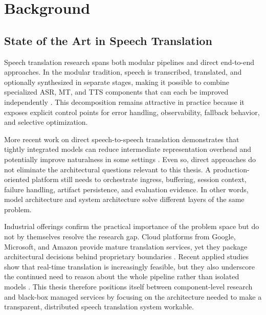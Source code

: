 \chapter{Background}
\label{chap:background}


\section{State of the Art in Speech Translation}
\label{sec:sota}

Speech translation research spans both modular pipelines and direct end-to-end approaches. In the modular tradition, speech is transcribed, translated, and optionally synthesized in separate stages, making it possible to combine specialized ASR, MT, and TTS components that can each be improved independently \cite{bahdanau2014neural,vaswani2017attention,radford2022whisper,wang2020fairseq}. This decomposition remains attractive in practice because it exposes explicit control points for error handling, observability, fallback behavior, and selective optimization.

More recent work on direct speech-to-speech translation demonstrates that tightly integrated models can reduce intermediate representation overhead and potentially improve naturalness in some settings \cite{inaguma2023unity,sarim2024direct,zhang2024direct}. Even so, direct approaches do not eliminate the architectural questions relevant to this thesis. A production-oriented platform still needs to orchestrate ingress, buffering, session context, failure handling, artifact persistence, and evaluation evidence. In other words, model architecture and system architecture solve different layers of the same problem.

Industrial offerings confirm the practical importance of the problem space but do not by themselves resolve the research gap. Cloud platforms from Google, Microsoft, and Amazon provide mature translation services, yet they package architectural decisions behind proprietary boundaries \cite{google_cloud_translate,microsoft_translator,aws_transcribe,aws_translate,aws_polly}. Recent applied studies show that real-time translation is increasingly feasible, but they also underscore the continued need to reason about the whole pipeline rather than isolated models \cite{oinam2025ai,kumar2025realtime}. This thesis therefore positions itself between component-level research and black-box managed services by focusing on the architecture needed to make a transparent, distributed speech translation system workable.

